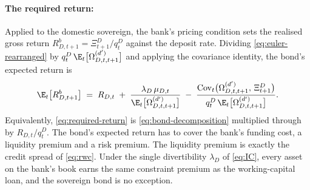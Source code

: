 \paragraph{The required return:}
Applied to the domestic sovereign, the bank's pricing condition sets the
realised gross return $R^{b}_{D,t+1}=\Xi^{D}_{t+1}/q^{D}_t$ against the deposit
rate. Dividing \eqref{eq:euler-rearranged} by
$q^{D}_t\,\E_t\bigl[\Omega^{(d')}_{D,t,t+1}\bigr]$ and applying the covariance
identity, the bond's expected return is
\begin{equation}
\E_t\bigl[R^{b}_{D,t+1}\bigr]
\;=\;R_{D,t}
\;+\;\frac{\lambda_D\,\mu_{D,t}}{\E_t\bigl[\Omega^{(d')}_{D,t,t+1}\bigr]}
\;-\;\frac{\mathrm{Cov}_t\bigl(\Omega^{(d')}_{D,t,t+1},\,\Xi^{D}_{t+1}\bigr)}
         {q^{D}_t\,\E_t\bigl[\Omega^{(d')}_{D,t,t+1}\bigr]} .
\label{eq:required-return}
\end{equation}
Equivalently, \eqref{eq:required-return} is \eqref{eq:bond-decomposition}
multiplied through by $R_{D,t}/q^{D}_t$. The bond's expected return has to cover
the bank's funding cost, a liquidity premium and a risk premium. The liquidity
premium is exactly the credit spread of \eqref{eq:rwc}. Under the single
divertibility $\lambda_D$ of \eqref{eq:IC}, every asset on the bank's book earns
the same constraint premium as the working-capital loan, and the sovereign bond
is no exception.

